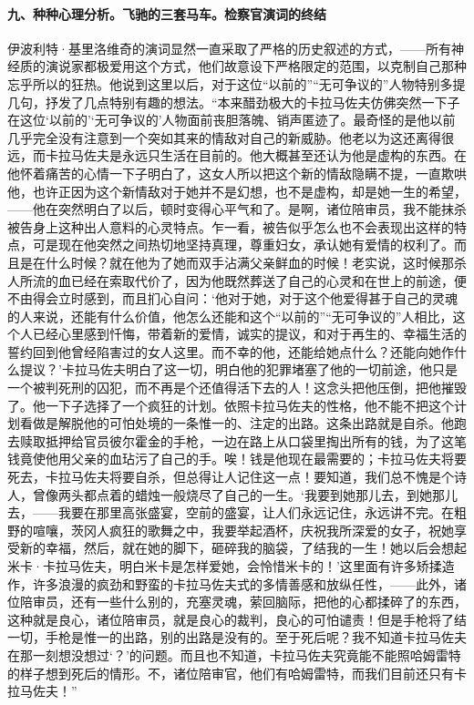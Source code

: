 \paragraph*{九、种种心理分析。飞驰的三套马车。检察官演词的终结}
\par 伊波利特·基里洛维奇的演词显然一直采取了严格的历史叙述的方式，——所有神经质的演说家都极爱用这个方式，他们故意设下严格限定的范围，以克制自己那种忘乎所以的狂热。他说到这里以后，对于这位“以前的”“无可争议的”人物特别多提几句，抒发了几点特别有趣的想法。“本来醋劲极大的卡拉马佐夫仿佛突然一下子在这位‘以前的’‘无可争议的’人物面前丧胆落魄、销声匿迹了。最奇怪的是他以前几乎完全没有注意到一个突如其来的情敌对自己的新威胁。他老以为这还离得很远，而卡拉马佐夫是永远只生活在目前的。他大概甚至还认为他是虚构的东西。在他怀着痛苦的心情一下子明白了，这女人所以把这个新的情敌隐瞒不提，一直欺哄他，也许正因为这个新情敌对于她并不是幻想，也不是虚构，却是她一生的希望，——他在突然明白了以后，顿时变得心平气和了。是啊，诸位陪审员，我不能抹杀被告身上这种出人意料的心灵特点。乍一看，被告似乎怎么也不会表现出这样的特点，可是现在他突然之间热切地坚持真理，尊重妇女，承认她有爱情的权利了。而且是在什么时候？就在他为了她而双手沾满父亲鲜血的时候！老实说，这时候那杀人所流的血已经在索取代价了，因为他既然葬送了自己的心灵和在世上的前途，便不由得会立时感到，而且扪心自问：‘他对于她，对于这个他爱得甚于自己的灵魂的人来说，还能有什么价值，他怎么还能和这个“以前的”“无可争议的”人相比，这个人已经心里感到忏悔，带着新的爱情，诚实的提议，和对于再生的、幸福生活的誓约回到他曾经陷害过的女人这里。而不幸的他，还能给她点什么？还能向她作什么提议？’卡拉马佐夫明白了这一切，明白他的犯罪堵塞了他的一切前途，他只是一个被判死刑的囚犯，而不再是个还值得活下去的人！这念头把他压倒，把他摧毁了。他一下子选择了一个疯狂的计划。依照卡拉马佐夫的性格，他不能不把这个计划看做是解脱他的可怕处境的一条惟一的、注定的出路。这条出路就是自杀。他跑去赎取抵押给官员彼尔霍金的手枪，一边在路上从口袋里掏出所有的钱，为了这笔钱竟使他用父亲的血玷污了自己的手。唉！钱是他现在最需要的；卡拉马佐夫将要死去，卡拉马佐夫将要自杀，但总得让人记住这一点！要知道，我们总不愧是个诗人，曾像两头都点着的蜡烛一般烧尽了自己的一生。‘我要到她那儿去，到她那儿去，——我要在那里高张盛宴，空前的盛宴，让人们永远记住，永远讲不完。在粗野的喧嚷，茨冈人疯狂的歌舞之中，我要举起酒杯，庆祝我所深爱的女子，祝她享受新的幸福，然后，就在她的脚下，砸碎我的脑袋，了结我的一生！她以后会想起米卡·卡拉马佐夫，明白米卡是怎样爱她，会怜惜米卡的！’这里面有许多矫揉造作，许多浪漫的疯劲和野蛮的卡拉马佐夫式的多情善感和放纵任性，——此外，诸位陪审员，还有一些什么别的，充塞灵魂，萦回脑际，把他的心都揉碎了的东西，这种就是良心，诸位陪审员，就是良心的裁判，良心的可怕谴责！但是手枪将了结一切，手枪是惟一的出路，别的出路是没有的。至于死后呢？我不知道卡拉马佐夫在那一刻想没想过‘？’的问题。而且也不知道，卡拉马佐夫究竟能不能照哈姆雷特的样子想到死后的情形。不，诸位陪审官，他们有哈姆雷特，而我们目前还只有卡拉马佐夫！”
